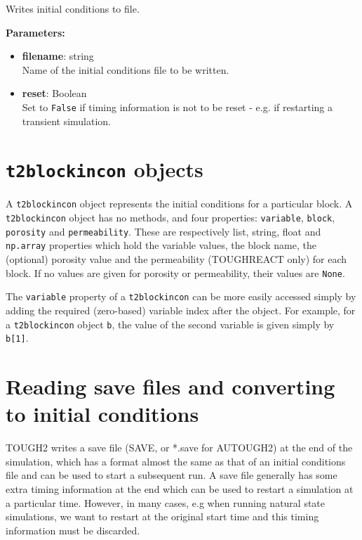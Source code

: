 Writes initial conditions to file.

\textbf{Parameters:}
\begin{itemize}
\item \textbf{filename}: string\\
  Name of the initial conditions file to be written.
\item \textbf{reset}: Boolean\\
  Set to \texttt{False} if timing information is not to be reset - e.g. if restarting a transient simulation.
\end{itemize}

\section{\texttt{t2blockincon} objects}
\label{t2blockincons}

A \texttt{t2blockincon} object represents the initial conditions for a particular block.  A \texttt{t2blockincon} object has no methods, and four properties: \texttt{variable}, \texttt{block}, \texttt{porosity} and \texttt{permeability}.  These are respectively list, string, float and \texttt{np.array} properties which hold the variable values, the block name, the (optional) porosity value and the permeability (TOUGHREACT only) for each block.  If no values are given for porosity or permeability, their values are \texttt{None}.

The \texttt{variable} property of a \texttt{t2blockincon} can be more easily accessed simply by adding the required (zero-based) variable index after the object.  For example, for a \texttt{t2blockincon} object \texttt{b}, the value of the second variable is given simply by \texttt{b[1]}.

\section{Reading save files and converting to initial conditions}

TOUGH2 writes a save file (SAVE, or *.save for AUTOUGH2) at the end of the simulation, which has a format almost the same as that of an initial conditions file and can be used to start a subsequent run.  A save file generally has some extra timing information at the end which can be used to restart a simulation at a particular time.  However, in many cases, e.g when running natural state simulations, we want to restart at the original start time and this timing information must be discarded.

